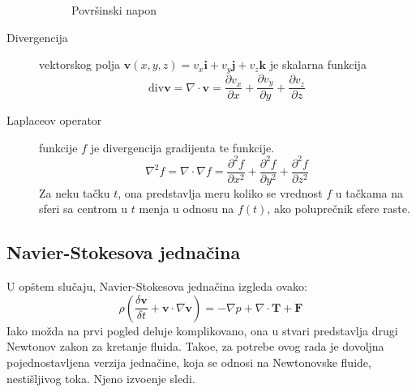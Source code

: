 \documentclass[12pt]{article}
\renewcommand{\vec}[1]{\mathbf{#1}}
\begin{document}
\begin{description}
\begin{figure}[H]
                \caption{Povr\v sinski napon}
                \end{figure}
          \item[Divergencija] vektorskog polja $\vec{v}(x, y, z)=v_x\vec{i}+v_y\vec{j}+v_z\vec{k}$ je skalarna funkcija
                $$\text{div} \vec{v} = \nabla \cdot \vec{v} = \frac{\partial v_x}{\partial x} + \frac{\partial v_y}{\partial y} + \frac{\partial v_z}{\partial z}$$
          \item[Laplaceov operator] funkcije $f$ je divergencija gradijenta te funkcije. $$\nabla^2 f = \nabla\cdot\nabla f = \frac{\partial^2 f}{\partial x^2} + \frac{\partial^2 f}{\partial y^2} + \frac{\partial^2 f}{\partial z^2}$$
              Za neku ta\v cku $t$, ona predstavlja meru koliko se vrednost $f$ u ta\v ckama na sferi sa centrom u $t$ menja u odnosu na $f(t)$, ako polupre\v cnik sfere raste.
        \end{description}
    \subsection{Navier-Stokesova jedna\v cina} \label{Navier Stokes}
        U op\v stem slu\v caju, Navier-Stokesova jedna\v cina izgleda ovako:
        $$ \rho(\frac{\delta \vec{v}}{\delta t} + \vec{v} \cdot \nabla \vec{v}) = -\nabla p + \nabla \cdot \vec{T} + \vec{F} $$
        Iako mo\v zda na prvi pogled deluje komplikovano, ona u stvari predstavlja drugi Newtonov zakon za kretanje fluida. Tako\dj e, za potrebe ovog rada je dovoljna pojednostavljena verzija jedna\v cine, koja se odnosi na Newtonovske fluide, nesti\v sljivog toka. Njeno izvo\dj enje sledi.
\end{document}
